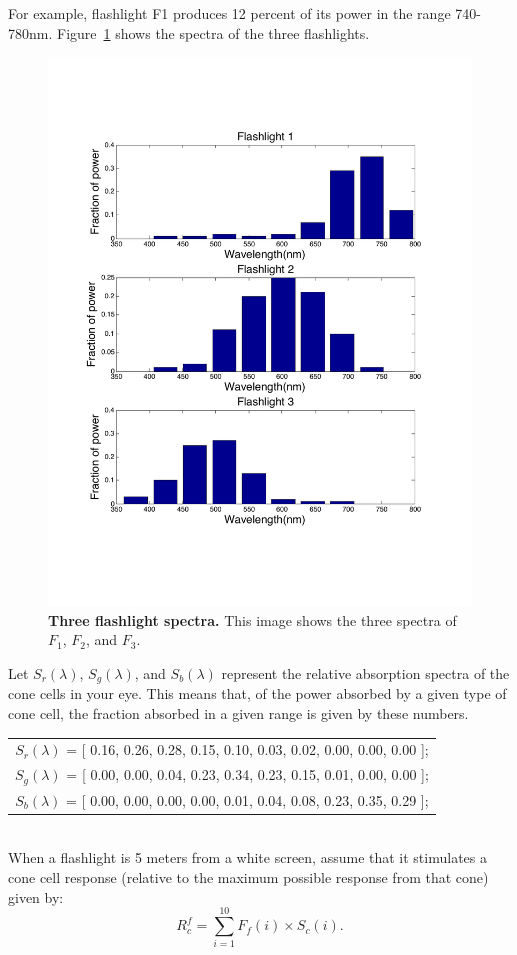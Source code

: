 \documentclass[10pt,letterpaper]{article}
\begin{document}
For example, flashlight F1 produces 12 percent of its power in the range 740-780nm. Figure~\ref{fig:spectra} shows the spectra of the three flashlights.\\

\begin{figure}[h]
\centering
\includegraphics[width=0.5\linewidth]{flashlight-spectrum.pdf}
\caption{\label{fig:spectra}\textbf{Three flashlight spectra.} This image shows the three spectra of $F_1$, $F_2$, and $F_3$.}
\end{figure}

Let $S_r(\lambda)$, $S_g(\lambda)$, and $S_b(\lambda)$ represent the relative absorption spectra of the cone cells in your eye. This means that, of the power absorbed by a given type of cone cell, the fraction absorbed in a given range is given by these numbers.\\

\begin{tabular}{c}
$S_r(\lambda)$ = [ 0.16, 0.26, 0.28, 0.15, 0.10, 0.03, 0.02, 0.00, 0.00, 0.00 ]; \\
$S_g(\lambda)$ = [ 0.00, 0.00, 0.04, 0.23, 0.34, 0.23, 0.15, 0.01, 0.00, 0.00 ];\\
$S_b(\lambda)$ = [ 0.00, 0.00, 0.00, 0.00, 0.01, 0.04, 0.08, 0.23, 0.35, 0.29 ];
\end{tabular}\\

When a flashlight is 5 meters from a white screen, assume that it stimulates
a cone cell response (relative to the maximum possible response from that cone)
given by: \\
\begin{equation*}
R^f_c = \sum_{i=1}^{10} F_f (i) \times S_c(i).
\end{equation*}
\end{document}
